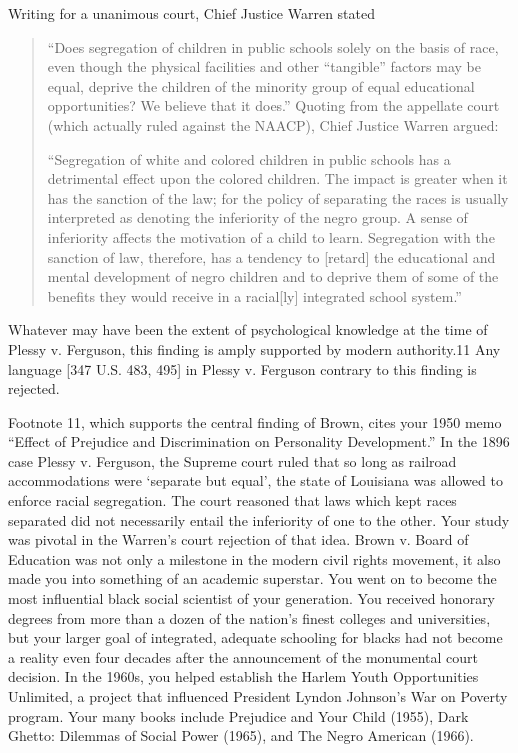 Writing for a unanimous court, Chief Justice Warren stated

\begin{quote}

“Does segregation of children in public schools solely on the basis of race, even though the physical facilities and other ``tangible'' factors may be equal, deprive the children of the minority group of equal educational opportunities? We believe that it does.”
Quoting from the appellate court (which actually ruled against the NAACP), Chief Justice Warren argued:

``Segregation of white and colored children in public schools has a detrimental effect upon the colored children. The impact is greater when it has the sanction of the law; for the policy of separating the races is usually interpreted as denoting the inferiority of the negro group. A sense of inferiority affects the motivation of a child to learn. Segregation with the sanction of law, therefore, has a tendency to [retard] the educational and mental development of negro children and to deprive them of some of the benefits they would receive in a racial[ly] integrated school system.'' 
\end{quote}

Whatever may have been the extent of psychological knowledge at the time of Plessy v. Ferguson, this finding is amply supported by modern authority.11 Any language [347 U.S. 483, 495] in Plessy v. Ferguson contrary to this finding is rejected.

Footnote 11, which supports the central finding of Brown, cites your 1950 memo “Effect of Prejudice and Discrimination on Personality Development.”
In the 1896 case Plessy v. Ferguson, the Supreme court ruled that so long as railroad accommodations were `separate but equal', the state of Louisiana was allowed to enforce racial segregation. The court reasoned that laws which kept races separated did not necessarily entail the inferiority of one to the other. Your study was pivotal in the Warren's court rejection of that idea.
Brown v. Board of Education was not only a milestone in the modern civil rights movement, it also made you into something of an academic superstar. You went on to become the most influential black social scientist of your generation. You received honorary degrees from more than a dozen of the nation's finest colleges and universities, but your larger goal of integrated, adequate schooling for blacks had not become a reality even four decades after the announcement of the monumental court decision.
In the 1960s, you helped establish the Harlem Youth Opportunities Unlimited, a project that influenced President Lyndon Johnson's War on Poverty program.
Your many books include Prejudice and Your Child (1955), Dark Ghetto: Dilemmas of Social Power (1965), and The Negro American (1966). 

